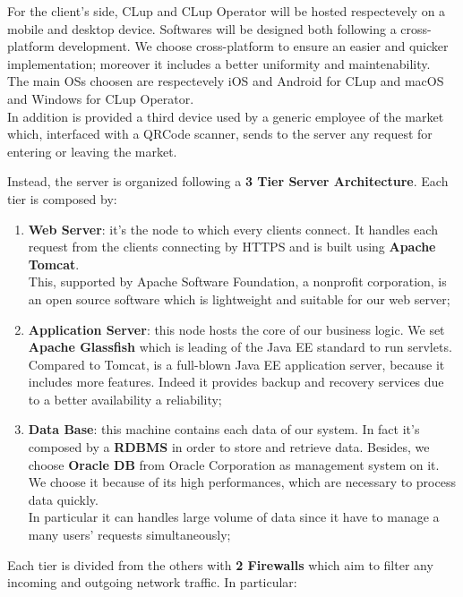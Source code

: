 For the client's side, CLup and CLup Operator will be hosted respectevely on a mobile and desktop device. Softwares will be designed both following a cross-platform development. 
We choose cross-platform to ensure an easier and quicker implementation; moreover it includes a better uniformity and maintenability.\\ 
The main OSs choosen are respectevely iOS and Android for CLup and macOS and Windows for CLup Operator.\\
In addition is provided a third device used by a generic employee of the market which, interfaced with a QRCode scanner, sends to the server any request for entering or leaving  the market. \pagebreak

Instead, the server is organized following a \textbf{3 Tier Server Architecture}. Each tier is composed by:

\begin{enumerate}
\item \textbf{Web Server}: it's the node to which every clients connect. It handles each request from the clients connecting by HTTPS and is built using \textbf{Apache Tomcat}. \\
This, supported by Apache Software Foundation, a nonprofit corporation, is an open source software which is lightweight and suitable for our web server;
\item \textbf{Application Server}: this node hosts the core of our business logic. We set \textbf{Apache Glassfish} which is leading of the Java EE standard to run servlets.\\
Compared to Tomcat, is a full-blown Java EE application server, because it includes more features. Indeed it provides backup and recovery services due to a better availability a reliability;

\item \textbf{Data Base}: this machine contains each data of our system. In fact it's composed by a \textbf{RDBMS} in order to store and retrieve data. Besides, we choose \textbf{Oracle DB} from Oracle Corporation as management system on it. We choose it because of its high performances, which are necessary to process data quickly. \\
In particular it can handles large volume of data since it have to manage a many users' requests simultaneously;
\end{enumerate}
\bigskip
Each tier is divided from the others with \textbf{2 Firewalls} which aim to filter any incoming and outgoing network traffic.
In particular:

